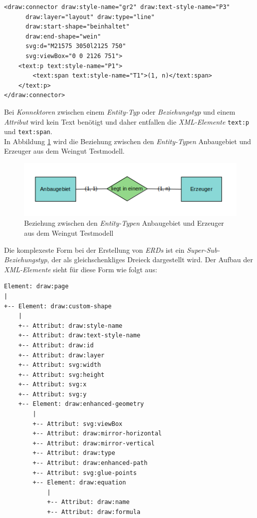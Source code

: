 \begin{verbatim}
<draw:connector draw:style-name="gr2" draw:text-style-name="P3"
      draw:layer="layout" draw:type="line" 
      draw:start-shape="beinhaltet" 
      draw:end-shape="wein" 
      svg:d="M21575 3050l2125 750" 
      svg:viewBox="0 0 2126 751">
    <text:p text:style-name="P1">
        <text:span text:style-name="T1">(1, n)</text:span>
    </text:p>
</draw:connector>
\end{verbatim}
\hon{}
\noindent
Bei \textit{Konnektoren} zwischen einem \textit{Entity-Typ} oder \textit{Beziehungstyp} und einem \textit{Attribut} wird kein Text benötigt und daher entfallen die \textit{XML-Elemente} \verb|text:p| und \verb|text:span|.
\\
\noindent
In Abbildung \ref{ergebnis9} wird die Beziehung zwischen den \textit{Entity-Typen} Anbaugebiet und Erzeuger aus dem Weingut Testmodell.

\begin{figure}[H]
	\centering
	\includegraphics[width=14cm]{images/16.png}
	\caption{Beziehung zwischen den \textit{Entity-Typen} Anbaugebiet und Erzeuger aus dem Weingut Testmodell}
	\label{ergebnis9}
\end{figure}
\hon{}
\noindent
Die komplexeste Form bei der Erstellung von \textit{ERDs} ist ein \textit{Super-Sub-Beziehungstyp}, der als gleichschenkliges Dreieck dargestellt wird. Der Aufbau der \textit{XML-Elemente} sieht für diese Form wie folgt aus:
\begin{verbatim}
Element: draw:page
|
+-- Element: draw:custom-shape
    |
    +-- Attribut: draw:style-name
    +-- Attribut: draw:text-style-name
    +-- Attribut: draw:id
    +-- Attribut: draw:layer
    +-- Attribut: svg:width
    +-- Attribut: svg:height
    +-- Attribut: svg:x
    +-- Attribut: svg:y
    +-- Element: draw:enhanced-geometry
        |
        +-- Attribut: svg:viewBox
        +-- Attribut: draw:mirror-horizontal
        +-- Attribut: draw:mirror-vertical
        +-- Attribut: draw:type
        +-- Attribut: draw:enhanced-path
        +-- Attribut: svg:glue-points
        +-- Element: draw:equation
            |
            +-- Attribut: draw:name
            +-- Attribut: draw:formula

\end{verbatim}	

